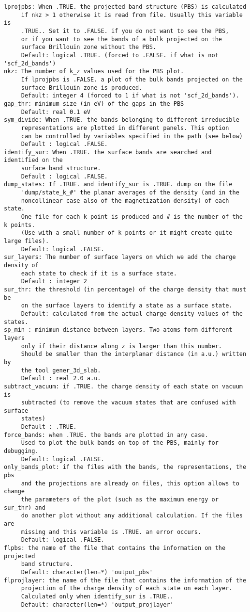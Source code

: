 \documentclass[12pt,a4paper]{article}
\begin{document}
\begin{verbatim}
lprojpbs: When .TRUE. the projected band structure (PBS) is calculated 
     if nkz > 1 otherwise it is read from file. Usually this variable is
     .TRUE.. Set it to .FALSE. if you do not want to see the PBS, 
     or if you want to see the bands of a bulk projected on the 
     surface Brillouin zone without the PBS.
     Default: logical .TRUE. (forced to .FALSE. if what is not 'scf_2d_bands')
nkz: The number of k_z values used for the PBS plot. 
     If lprojpbs is .FALSE. a plot of the bulk bands projected on the 
     surface Brillouin zone is produced.
     Default: integer 4 (forced to 1 if what is not 'scf_2d_bands').
gap_thr: minimum size (in eV) of the gaps in the PBS
     Default: real 0.1 eV
sym_divide: When .TRUE. the bands belonging to different irreducible 
     representations are plotted in different panels. This option
     can be controlled by variables specified in the path (see below)
     Default : logical .FALSE.
identify_sur: When .TRUE. the surface bands are searched and identified on the
     surface band structure. 
     Default : logical .FALSE.
dump_states: If .TRUE. and identify_sur is .TRUE. dump on the file 
     'dump/state_k_#' the planar averages of the density (and in the 
     noncollinear case also of the magnetization density) of each state. 
     One file for each k point is produced and # is the number of the k points.
     (Use with a small number of k points or it might create quite large files).
     Default: logical .FALSE.
sur_layers: The number of surface layers on which we add the charge density of 
     each state to check if it is a surface state.
     Default : integer 2
sur_thr: the threshold (in percentage) of the charge density that must be
     on the surface layers to identify a state as a surface state.
     Default: calculated from the actual charge density values of the states.
sp_min : minimun distance between layers. Two atoms form different layers
     only if their distance along z is larger than this number.
     Should be smaller than the interplanar distance (in a.u.) written by 
     the tool gener_3d_slab.
     Default : real 2.0 a.u.
subtract_vacuum: if .TRUE. the charge density of each state on vacuum is
     subtracted (to remove the vacuum states that are confused with surface
     states)
     Default : .TRUE.
force_bands: when .TRUE. the bands are plotted in any case.
     Used to plot the bulk bands on top of the PBS, mainly for debugging.
     Default: logical .FALSE.
only_bands_plot: if the files with the bands, the representations, the pbs
     and the projections are already on files, this option allows to change
     the parameters of the plot (such as the maximum energy or sur_thr) and
     do another plot without any additional calculation. If the files are
     missing and this variable is .TRUE. an error occurs.
     Default: logical .FALSE.
flpbs: the name of the file that contains the information on the projected
     band structure.
     Default: character(len=*) 'output_pbs'
flprojlayer: the name of the file that contains the information of the
     projection of the charge density of each state on each layer.
     Calculated only when identify_sur is .TRUE..
     Default: character(len=*) 'output_projlayer'
\end{verbatim}
\end{document}
